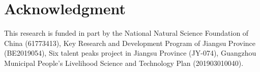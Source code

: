 \documentclass[a4paper,conference]{IEEEtran}
\begin{document}
\section*{Acknowledgment}
This research is funded in part by the National Natural Science Foundation of China (61773413), Key Research and Development Program of Jiangsu Province (BE2019054), Six talent peaks project in Jiangsu Province (JY-074), Guangzhou Municipal People's Livelihood Science and Technology Plan (201903010040).





\end{document}

